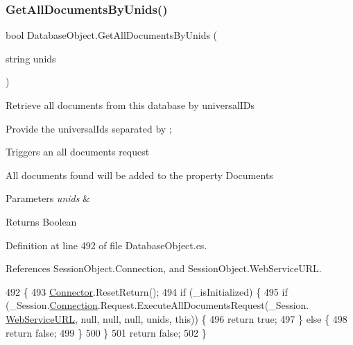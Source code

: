 \subsubsection{\texorpdfstring{Get\+All\+Documents\+By\+Unids()}{GetAllDocumentsByUnids()}\hspace{0.1cm}{\footnotesize\ttfamily [1/2]}}
{\footnotesize\ttfamily bool Database\+Object.\+Get\+All\+Documents\+By\+Unids (\begin{DoxyParamCaption}\item[{string}]{unids }\end{DoxyParamCaption})}



Retrieve all documents from this database by universal\+I\+Ds 

Provide the universal\+Ids separated by ;

Triggers an all documents request

All documents found will be added to the property \textquotesingle{}Documents\textquotesingle{}


\begin{DoxyParams}{Parameters}
{\em unids} & \\
\hline
\end{DoxyParams}
\begin{DoxyReturn}{Returns}
Boolean
\end{DoxyReturn}


Definition at line 492 of file Database\+Object.\+cs.



References Session\+Object.\+Connection, and Session\+Object.\+Web\+Service\+U\+RL.


\begin{DoxyCode}
492                                                      \{
493         \mbox{\hyperlink{class_connector}{Connector}}.ResetReturn();
494         \textcolor{keywordflow}{if} (\_isInitialized) \{
495             \textcolor{keywordflow}{if} (\_Session.\mbox{\hyperlink{class_session_object_a014bdbf705a753540e19bfb53030c55c}{Connection}}.Request.ExecuteAllDocumentsRequest(\_Session.
      \mbox{\hyperlink{class_session_object_a697c071c812fbf7ad1166b896fb44c16}{WebServiceURL}}, null, null, null, unids, \textcolor{keyword}{this})) \{
496                 \textcolor{keywordflow}{return} \textcolor{keyword}{true};
497             \} \textcolor{keywordflow}{else} \{
498                 \textcolor{keywordflow}{return} \textcolor{keyword}{false};
499             \}
500         \}
501         \textcolor{keywordflow}{return} \textcolor{keyword}{false};
502     \}
\end{DoxyCode}
\mbox{\label{class_database_object_a92e80ea30e83cddf47f29d0f502b81c5}} 
